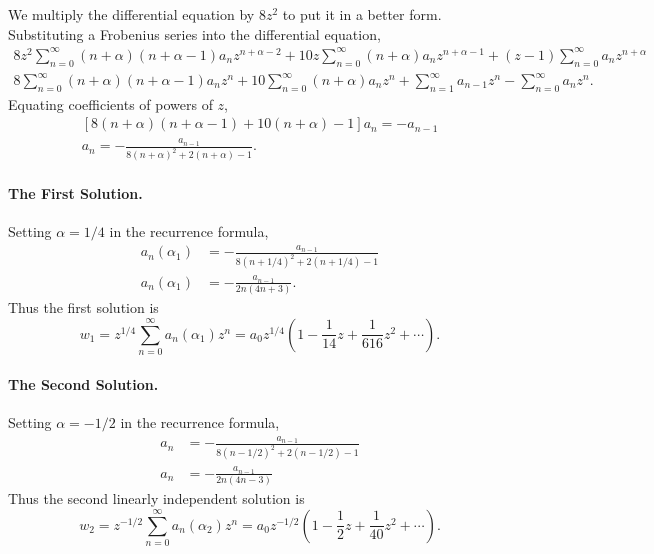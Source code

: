 {\begin{Solution}
  We multiply the differential equation by $8z^2$ to put it in a better form.
  Substituting a Frobenius series into the differential equation,
  \begin{gather*}
    8z^2 \sum_{n=0}^\infty (n + \alpha)(n + \alpha - 1) a_n z^{n+\alpha-2}
    + 10 z \sum_{n=0}^\infty (n + \alpha) a_n z^{n + \alpha - 1}
    + (z-1) \sum_{n=0}^\infty a_n z^{n + \alpha} \\
    8 \sum_{n=0}^\infty (n + \alpha)(n + \alpha - 1) a_n z^n
    + 10 \sum_{n=0}^\infty (n + \alpha) a_n z^n
    + \sum_{n=1}^\infty a_{n-1} z^n -  \sum_{n=0}^\infty a_n z^n .
  \end{gather*}
  Equating coefficients of powers of $z$,
  \begin{gather*}
    \left[8 (n + \alpha)(n + \alpha - 1) + 10 (n + \alpha)
      - 1 \right] a_n = - a_{n-1} \\
    a_n = - \frac{a_{n-1}}{8(n+\alpha)^2 + 2 (n+\alpha)-1}.
  \end{gather*}

  \paragraph{The First Solution.}
  Setting $\alpha = 1/4$ in the recurrence formula,
  \begin{align*}
    a_n(\alpha_1)   &= -\frac{a_{n-1}}{8(n + 1/4)^2 + 2 (n + 1/4) - 1} \\
    a_n(\alpha_1)   &= -\frac{a_{n-1}}{2n(4n+3)} .
  \end{align*}
  Thus the first solution is
  \[ \boxed{ w_1 = z^{1/4} \sum_{n=0}^\infty a_n(\alpha_1) z^n
    = a_0 z^{1/4} \left( 1 - \frac{1}{14} z + \frac{1}{616} z^2 + \cdots
    \right).} \]

  \paragraph{The Second Solution.}
  Setting $\alpha = -1/2$ in the recurrence formula,
  \begin{align*}
    a_n &= - \frac{a_{n-1}}{8(n-1/2)^2 + 2 (n-1/2)-1} \\
    a_n &= - \frac{a_{n-1}}{2n(4n-3)} 
  \end{align*}
  Thus the second linearly independent solution is
  \[ \boxed{ w_2 = z^{-1/2} \sum_{n=0}^\infty a_n(\alpha_2) z^n
    = a_0 z^{-1/2} \left(1 - \frac{1}{2}z + \frac{1}{40}z^2 
      + \cdots \right) .} \]
\end{Solution}









}
